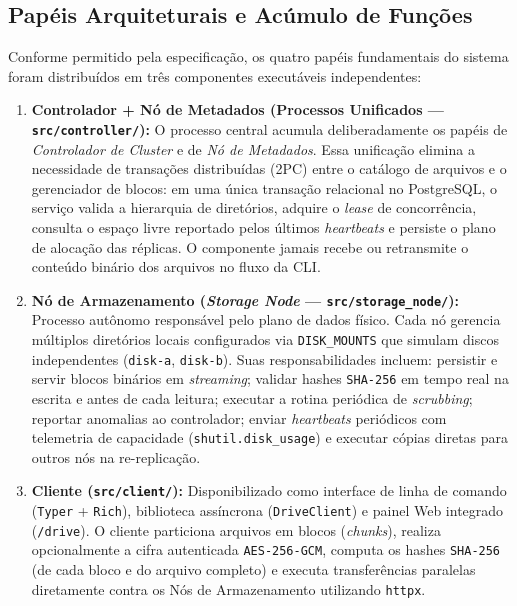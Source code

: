 \documentclass[10pt,a4paper]{article}
\begin{document}
\subsection{Papéis Arquiteturais e Acúmulo de Funções}
Conforme permitido pela especificação, os quatro papéis fundamentais do sistema foram distribuídos em três componentes executáveis independentes:

\begin{enumerate}
    \item \textbf{Controlador + Nó de Metadados (Processos Unificados — \texttt{src/controller/}):} O processo central acumula deliberadamente os papéis de \textit{Controlador de Cluster} e de \textit{Nó de Metadados}. Essa unificação elimina a necessidade de transações distribuídas (2PC) entre o catálogo de arquivos e o gerenciador de blocos: em uma única transação relacional no PostgreSQL, o serviço valida a hierarquia de diretórios, adquire o \textit{lease} de concorrência, consulta o espaço livre reportado pelos últimos \textit{heartbeats} e persiste o plano de alocação das réplicas. O componente jamais recebe ou retransmite o conteúdo binário dos arquivos no fluxo da CLI.
    \item \textbf{Nó de Armazenamento (\textit{Storage Node} — \texttt{src/storage\_node/}):} Processo autônomo responsável pelo plano de dados físico. Cada nó gerencia múltiplos diretórios locais configurados via \texttt{DISK\_MOUNTS} que simulam discos independentes (\texttt{disk-a}, \texttt{disk-b}). Suas responsabilidades incluem: persistir e servir blocos binários em \textit{streaming}; validar hashes \texttt{SHA-256} em tempo real na escrita e antes de cada leitura; executar a rotina periódica de \textit{scrubbing}; reportar anomalias ao controlador; enviar \textit{heartbeats} periódicos com telemetria de capacidade (\texttt{shutil.disk\_usage}) e executar cópias diretas para outros nós na re-replicação.
    \item \textbf{Cliente (\texttt{src/client/}):} Disponibilizado como interface de linha de comando (\texttt{Typer} + \texttt{Rich}), biblioteca assíncrona (\texttt{DriveClient}) e painel Web integrado (\texttt{/drive}). O cliente particiona arquivos em blocos (\textit{chunks}), realiza opcionalmente a cifra autenticada \texttt{AES-256-GCM}, computa os hashes \texttt{SHA-256} (de cada bloco e do arquivo completo) e executa transferências paralelas diretamente contra os Nós de Armazenamento utilizando \texttt{httpx}.
\end{enumerate}
\end{document}
